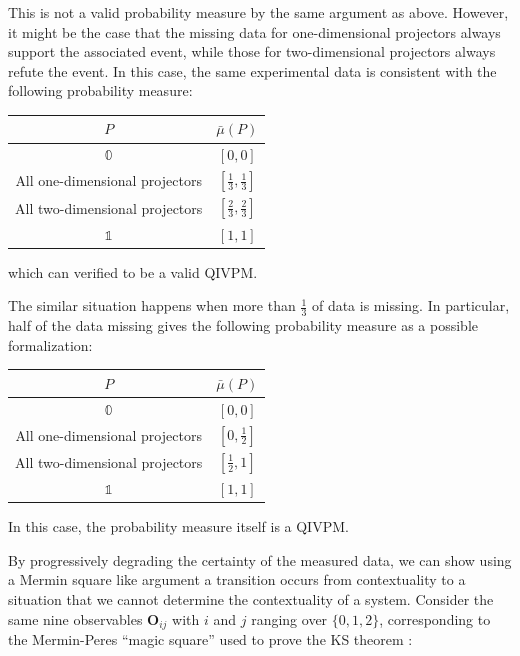 \documentclass[english,reprint, aps, prl,superscriptaddress, showpacs,
showkeys, longbibliography, amsmath, amssymb, floatfix]{revtex4-1}
\theoremstyle{plain}
\theoremstyle{definition}
\newcommand{\imposs}{\ensuremath{\left[0,0\right]}}
\newcommand{\necess}{\ensuremath{\left[1,1\right]}}
\begin{document}
\noindent This is not a valid probability measure by the same argument
as above. However, it might be the case that the missing data for
one-dimensional projectors always support the associated event, while
those for two-dimensional projectors always refute the event. In this
case, the same experimental data is consistent with the following
probability measure:
\begin{center}
\begin{tabular}{cc}
\toprule 
\addlinespace
$P$  & $\bar{\mu}\left(P\right)$\tabularnewline
\midrule
\midrule 
\addlinespace
$\mathbb{0}$ & $\imposs$\tabularnewline
\midrule 
\addlinespace
All one-dimensional projectors & $\left[\tfrac{1}{3},\tfrac{1}{3}\right]$\tabularnewline
\midrule 
\addlinespace
All two-dimensional projectors & $\left[\tfrac{2}{3},\tfrac{2}{3}\right]$\tabularnewline
\midrule 
\addlinespace
$\mathbb{1}$ & $\necess$\tabularnewline
\bottomrule
\end{tabular}
\par\end{center}

\noindent which can verified to be a valid QIVPM.

The similar situation happens when more than $\frac{1}{3}$ of data
is missing. In particular, half of the data missing gives the following
probability measure as a possible formalization:
\begin{center}
\begin{tabular}{cc}
\toprule 
\addlinespace
$P$  & $\bar{\mu}\left(P\right)$\tabularnewline
\midrule
\midrule 
\addlinespace
$\mathbb{0}$ & $\imposs$\tabularnewline
\midrule 
\addlinespace
All one-dimensional projectors & $\left[0,\tfrac{1}{2}\right]$\tabularnewline
\midrule 
\addlinespace
All two-dimensional projectors & $\left[\tfrac{1}{2},1\right]$\tabularnewline
\midrule 
\addlinespace
$\mathbb{1}$ & $\necess$\tabularnewline
\bottomrule
\end{tabular}
\par\end{center}

\noindent In this case, the probability measure itself is a QIVPM.

By progressively degrading the certainty of the measured data, we
can show using a Mermin square like argument a transition occurs from
contextuality to a situation that we cannot determine the contextuality
of a system. Consider the same nine observables $\mathbf{O}_{ij}$
with $i$ and $j$ ranging over $\{0,1,2\}$, corresponding to the
Mermin-Peres ``magic square'' used to prove the KS theorem \cite{Mermin1990Simple,peres1995quantum,Griffiths2003}:
\end{document}
